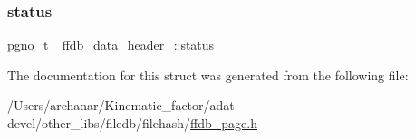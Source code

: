 \mbox{\label{struct__ffdb__data__header___a4c2b44b141df921e83933b19b1fd4e44}} 
\subsubsection{\texorpdfstring{status}{status}}
{\footnotesize\ttfamily \mbox{\hyperlink{adat-devel_2other__libs_2filedb_2filehash_2ffdb__db_8h_a000813331643d38481142bcce7de1501}{pgno\+\_\+t}} \+\_\+ffdb\+\_\+data\+\_\+header\+\_\+\+::status}



The documentation for this struct was generated from the following file\+:\begin{DoxyCompactItemize}
\item 
/\+Users/archanar/\+Kinematic\+\_\+factor/adat-\/devel/other\+\_\+libs/filedb/filehash/\mbox{\hyperlink{adat-devel_2other__libs_2filedb_2filehash_2ffdb__page_8h}{ffdb\+\_\+page.\+h}}\end{DoxyCompactItemize}
